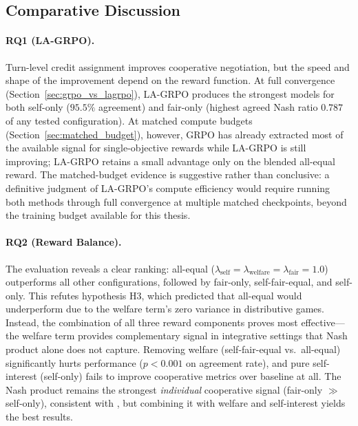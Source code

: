 \documentclass[12pt,a4paper]{article}
\begin{document}
\subsection{Comparative Discussion}

\paragraph{RQ1 (LA-GRPO).} Turn-level credit assignment improves cooperative negotiation, but the speed and shape of the improvement depend on the reward function. At full convergence (Section~\ref{sec:grpo_vs_lagrpo}), LA-GRPO produces the strongest models for both self-only ($95.5\%$ agreement) and fair-only (highest agreed Nash ratio $0.787$ of any tested configuration). At matched compute budgets (Section~\ref{sec:matched_budget}), however, GRPO has already extracted most of the available signal for single-objective rewards while LA-GRPO is still improving; LA-GRPO retains a small advantage only on the blended all-equal reward. The matched-budget evidence is suggestive rather than conclusive: a definitive judgment of LA-GRPO's compute efficiency would require running both methods through full convergence at multiple matched checkpoints, beyond the training budget available for this thesis.

\paragraph{RQ2 (Reward Balance).} The evaluation reveals a clear ranking: all-equal ($\lambda_{\text{self}} = \lambda_{\text{welfare}} = \lambda_{\text{fair}} = 1.0$) outperforms all other configurations, followed by fair-only, self-fair-equal, and self-only. This refutes hypothesis H3, which predicted that all-equal would underperform due to the welfare term's zero variance in distributive games. Instead, the combination of all three reward components proves most effective---the welfare term provides complementary signal in integrative settings that Nash product alone does not capture. Removing welfare (self-fair-equal vs.\ all-equal) significantly hurts performance ($p < 0.001$ on agreement rate), and pure self-interest (self-only) fails to improve cooperative metrics over baseline at all. The Nash product remains the strongest \emph{individual} cooperative signal (fair-only $\gg$ self-only), consistent with \citet{caragiannis2019unreasonable}, but combining it with welfare and self-interest yields the best results.
\end{document}
